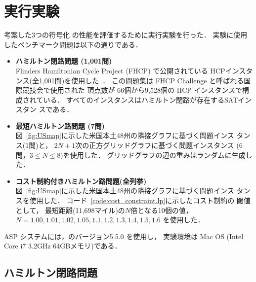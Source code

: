 ﻿%
\section{実行実験}\label{chap:experiment}

考案した3つの符号化
の性能を評価するために実行実験を行った．
実験に使用したベンチマーク問題は以下の通りである．

\begin{itemize}
\item \textbf{ハミルトン閉路問題 (1,001問)}\\
  Flinders Hamiltonian Cycle Project (FHCP) で公開されている
  HCPインスタンス(全1,001問)を使用した~\cite{haythorpe19:fhcp}．
  この問題集は FHCP Challenge と呼ばれる国際競技会で使用された
  頂点数が 66個から9,528個の HCP インスタンスで構成されている．
  すべてのインスタンスはハミルトン閉路が存在する\textsf{SAT}インスタン
  スである．
\item \textbf{最短ハミルトン路問題 (7問)}\\
  図~\ref{fig:USmap}に示した米国本土48州の隣接グラフに基づく問題インス
  タンス(1問)と，
  $2N+1$次の正方グリッドグラフに基づく問題インスタンス
  (6問，$3\leq N\leq 8$)を使用した．
  グリッドグラフの辺の重みはランダムに生成した．
\item \textbf{コスト制約付きハミルトン路問題(全列挙)}\\
  図~\ref{fig:USmap}に示した米国本土48州の隣接グラフに基づく問題インス
  タンスを使用した．
  コード~\ref{code:cost_constraint.lp}に示したコスト制約の
  閾値として，
  最短距離(11,698マイル)の$N$倍となる10個の値，
  $N=1.00,1.01,1.02,1.05,1.1,1.2,1.3,1.4,1.5,1.6$
  を使用した．
\end{itemize}

ASP システムには，{\clingo}のバージョン5.5.0 を使用し，
実験環境は Mac OS (Intel Core i7 3.2GHz 64GBメモリ)である．

\subsection{ハミルトン閉路問題}


